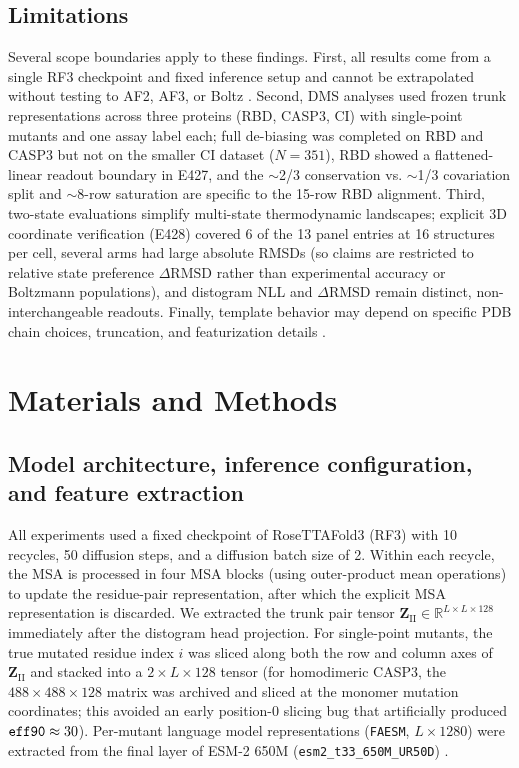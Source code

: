 \documentclass[10pt,a4paper]{article}
\begin{document}
\subsection{Limitations}
Several scope boundaries apply to these findings. First, all results come from a single RF3 checkpoint and fixed inference setup and cannot be extrapolated without testing to AF2, AF3, or Boltz \citep{jumper2021highly,abramson2024accurate,kovalevskiy2024alphafold}. Second, DMS analyses used frozen trunk representations across three proteins (RBD, CASP3, CI) with single-point mutants and one assay label each; full de-biasing was completed on RBD and CASP3 but not on the smaller CI dataset ($N=351$), RBD showed a flattened-linear readout boundary in E427, and the $\sim$2/3 conservation vs. $\sim$1/3 covariation split and $\sim$8-row saturation are specific to the 15-row RBD alignment. Third, two-state evaluations simplify multi-state thermodynamic landscapes; explicit 3D coordinate verification (E428) covered 6 of the 13 panel entries at 16 structures per cell, several arms had large absolute RMSDs (so claims are restricted to relative state preference $\Delta\mathrm{RMSD}$ rather than experimental accuracy or Boltzmann populations), and distogram NLL and $\Delta\mathrm{RMSD}$ remain distinct, non-interchangeable readouts. Finally, template behavior may depend on specific PDB chain choices, truncation, and featurization details \citep{watson2023novo}.

\section{Materials and Methods}

\subsection{Model architecture, inference configuration, and feature extraction}
All experiments used a fixed checkpoint of RoseTTAFold3 (RF3) \citep{corley2025atomworks} with 10 recycles, 50 diffusion steps, and a diffusion batch size of 2. Within each recycle, the MSA is processed in four MSA blocks (using outer-product mean operations) to update the residue-pair representation, after which the explicit MSA representation is discarded. We extracted the trunk pair tensor $\mathbf{Z}_{\mathrm{II}} \in \mathbb{R}^{L \times L \times 128}$ immediately after the distogram head projection. For single-point mutants, the true mutated residue index $i$ was sliced along both the row and column axes of $\mathbf{Z}_{\mathrm{II}}$ and stacked into a $2 \times L \times 128$ tensor (for homodimeric CASP3, the $488 \times 488 \times 128$ matrix was archived and sliced at the monomer mutation coordinates; this avoided an early position-0 slicing bug that artificially produced $\text{\texttt{eff90}} \approx 30$). Per-mutant language model representations (\texttt{FAESM}, $L \times 1280$) were extracted from the final layer of ESM-2 650M (\texttt{esm2\_t33\_650M\_UR50D}) \citep{lin2023evolutionary}.
\end{document}
